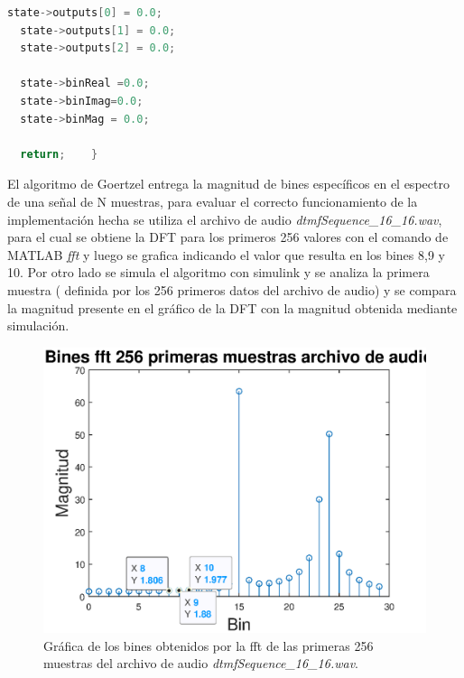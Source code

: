 \begin{enumerate}
\begin{lstlisting}[language = C]
  state->outputs[0] = 0.0;
  state->outputs[1] = 0.0;
  state->outputs[2] = 0.0;

  state->binReal =0.0;
  state->binImag=0.0;
  state->binMag = 0.0;

  return;    }
    \end{lstlisting}
    
    
    
El algoritmo de Goertzel entrega la magnitud de bines específicos en el espectro de una señal de N muestras, para evaluar el correcto funcionamiento de la implementación hecha se utiliza el archivo de audio \textit{dtmfSequence\_16\_16.wav}, para el cual se obtiene la DFT para los primeros 256 valores con el comando de MATLAB \textit{fft} y luego se grafica indicando el valor que resulta en los bines 8,9 y 10.  Por otro lado se simula el algoritmo con simulink y se analiza la primera muestra ( definida por los 256 primeros datos del archivo de audio) y se compara la magnitud presente en el gráfico de la DFT con la magnitud obtenida mediante simulación.

\begin{figure}[H]
    \centering
    \includegraphics[width = .8 \linewidth]{Figuras/p7_1-fft_dtmf.eps}
    \caption{Gráfica de los bines obtenidos por la fft de las primeras 256 muestras del archivo de audio \textit{dtmfSequence\_16\_16.wav}.}
    \label{fft_256}
\end{figure}


\end{enumerate}
